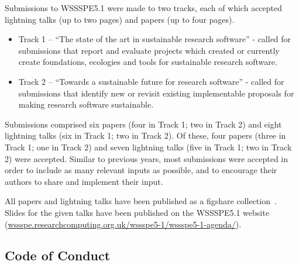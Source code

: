 \documentclass[11pt,letterpaper]{article}
\begin{document}
Submissions to WSSSPE5.1 were made to two tracks, each of which accepted lightning talks (up to two pages) and papers (up to four pages).

\begin{itemize}
\item Track 1 -- ``The state of the art in sustainable research software'' - called for submissions that report and evaluate projects which created or currently create foundations, ecologies and tools for sustainable research software.
\item Track 2 -- ``Towards a sustainable future for research software'' - called for submissions that identify new or revisit existing implementable proposals for making research software sustainable.
\end{itemize}

Submissions comprised six papers (four in Track 1; two in Track 2) and eight lightning talks (six in Track 1; two in  Track 2).
Of these, four papers (three in Track 1; one in Track 2) and seven lightning talks (five in Track 1; two in Track 2) were accepted.
Similar to previous years, most submissions were accepted in order to include as many relevant inputs as possible, and to encourage their authors to share and implement their input.

All papers and lightning talks have been published as a figshare collection~\cite{WSSSPE5_1_proceedings_2017}. Slides for the given talks have been published on the WSSSPE5.1 website (\href{http://wssspe.researchcomputing.org.uk/wssspe5-1/wssspe5-1-agenda/}{wssspe.researchcomputing.org.uk/wssspe5-1/wssspe5-1-agenda/}).

\subsection{Code of Conduct}\label{sec:CoC}

\end{document}
